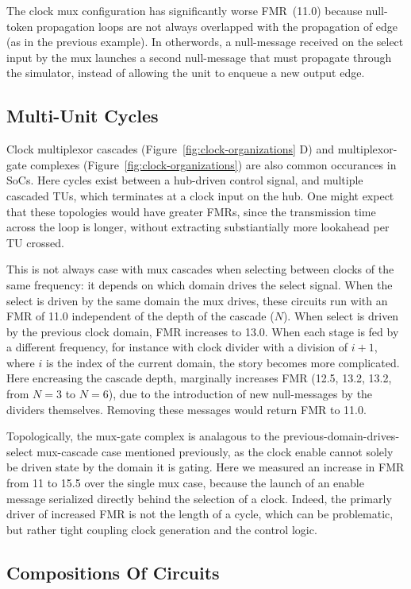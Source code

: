 The clock mux configuration has significantly worse FMR~(11.0) because null-token propagation loops
are not always overlapped with the propagation of edge (as in the previous
example). In otherwords, a null-message received on the select input by the mux launches a second
null-message that must propagate through the simulator, instead of allowing the
unit to enqueue a new output edge.

\subsection{Multi-Unit Cycles}

Clock multiplexor cascades (Figure~\ref{fig:clock-organizations} D) and
multiplexor-gate complexes (Figure~\ref{fig:clock-organizations}) are also
common occurances in SoCs. Here cycles exist between a hub-driven control
signal, and multiple cascaded TUs, which terminates at a clock input on the
hub. One might expect that these topologies would have greater FMRs, since the
transmission time across the loop is longer, without extracting substiantially
more lookahead per TU crossed.

This is not always case with mux cascades when selecting between clocks of the
same frequency: it depends on which domain drives the select signal. When the select is driven by the same domain the mux drives,
these circuits run with an FMR of 11.0 independent of the depth of the cascade ($N$).
When select is driven by the previous clock domain, FMR increases to
13.0.  When each stage is fed by a different frequency, for instance with clock
divider with a division of $i+1$, where $i$ is the index of the current domain,
the story becomes more complicated. Here encreasing the cascade depth,
marginally increases FMR (12.5, 13.2, 13.2, from $N=3$ to $N=6$), due to the
introduction of new null-messages by the dividers themselves. Removing these
messages would return FMR to 11.0.

Topologically, the mux-gate complex is analagous to the
previous-domain-drives-select mux-cascade case mentioned previously, as the
clock enable cannot solely be driven state by the domain it is gating. Here we
measured an increase in FMR from 11 to 15.5 over the single mux case, because
the launch of an enable message serialized directly behind the selection of a
clock. Indeed, the primarly driver of increased FMR is not the length of a
cycle, which can be problematic, but rather tight coupling clock generation and
the control logic.

\subsection{Compositions Of Circuits}

